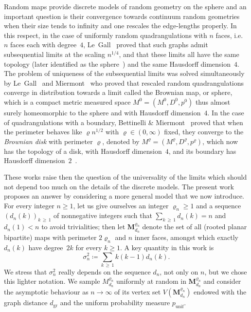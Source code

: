 \documentclass[AHL,Unicode,longabstracts,published]{cedram}
\newcommand{\1}{\ensembles{1}}
\newcommand{\Map}{\mathbf{M}}
\renewcommand{\ge}{\geqslant}
\newcommand{\Bmap}{M}
\newcommand{\dBmap}{D}
\newcommand{\pBmap}{p}
\newcommand{\Mn}{\Map_{d_n}^{\varrho_n}}
\newcommand{\mn}{M_{d_n}^{\varrho_n}}
\newcommand{\dgr}{d_{\mathrm{gr}}}
\newcommand{\pgr}{p_{\mathrm{unif}}}
\begin{document}
Random maps provide discrete models of random geometry on the sphere and an important question is their convergence towards continuum random geometries when their size tends to infinity and one rescales the edge-lengths properly. In this respect, in the case of uniformly random quadrangulations with $n$ faces, i.e. $n$ faces each with degree~$4$, Le~Gall~\cite{LG07} proved that such graphs admit subsequential limits at the scaling $n^{1/4}$, and that these limits all have the same topology (later identified as the sphere~\cite{LGP08, Mie08}) and the same Hausdorff dimension~$4$. The problem of uniqueness of the subsequential limits was solved simultaneously by Le~Gall~\cite{LG13} and Miermont~\cite{Mie13} who proved that rescaled random quadrangulations converge in distribution towards a limit called the Brownian map, or sphere, which is a compact metric measured space $\Bmap^0 = (\Bmap^0,\dBmap^0,\pBmap^0)$ thus almost surely homeomorphic to the sphere and with Hausdorff dimension~$4$. In the case of quadrangulations with a boundary, Bettinelli \& Miermont~\cite{BM17} proved that when the perimeter behaves like $\varrho n^{1/2}$ with $\varrho \in (0, \infty)$ fixed, they converge to the \emph{Brownian disk} with perimeter $\varrho$, denoted by $\Bmap^\varrho = (\Bmap^\varrho,\dBmap^\varrho, \pBmap^\varrho)$, which now has the topology of a disk, with Hausdorff dimension~$4$, and its boundary has Hausdorff dimension~$2$~\cite{Bet15}.

These works raise then the question of the universality of the limits which should not depend too much on the details of the discrete models. The present work proposes an answer by considering a more general model that we now introduce. For every integer $n \ge 1$, let us give ourselves an integer $\varrho_n \ge 1$ and a sequence $(d_n(k))_{k \,\ge\,1}$ of nonnegative integers such that $\sum_{k\,\ge\,1} d_n(k) = n$ and $d_n(1) < n$ to avoid trivialities; then let $\Mn$ denote the set of all (rooted planar bipartite) maps with perimeter $2 \varrho_n$ and $n$ inner faces, amongst which exactly $d_n(k)$ have degree~$2k$ for every $k \ge 1$. A key quantity in this work is
\[
\sigma_n^2 \coloneqq \sum_{k\,\ge\,1} k (k-1) d_n(k).
\]
We stress that $\sigma_n^2$ really depends on the sequence $d_{n}$, not only on $n$, but we chose this lighter notation. We sample $\mn$ uniformly at random in $\Mn$ and consider the asymptotic behaviour as $n \to \infty$ of its vertex set $V(\Mn)$ endowed with the graph distance $\dgr$ and the uniform probability measure $\pgr$.
\end{document}
